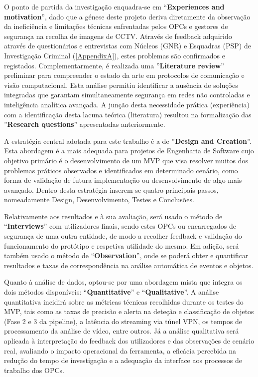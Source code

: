 O ponto de partida da investigação enquadra-se em ``\textbf{Experiences and motivation}'', dado que a génese deste projeto deriva diretamente da observação da ineficiência e limitações técnicas enfrentadas pelos \glspl{OPC} e gestores de segurança na recolha de imagens de \gls{CCTV}. Através de feedback adquirido através de questionários e entrevistas com Núcleos (\gls{GNR}) e Esquadras (\gls{PSP}) de Investigação Criminal (\autoref{AppendixA}), estes problemas são confirmados e registados. Complementarmente, é realizada uma ''\textbf{Literature review}'' preliminar para compreender o estado da arte em protocolos de comunicação e visão computacional. Esta análise permitiu identificar a ausência de soluções integradas que garantam simultaneamente segurança em redes não controladas e inteligência analítica avançada. A junção desta necessidade prática (experiência) com a identificação desta lacuna teórica (literatura) resultou na formalização das ''\textbf{Research questions}'' apresentadas anteriormente.

A estratégia central adotada para este trabalho é a de ''\textbf{Design and Creation}''. Esta abordagem é a mais adequada para projetos de Engenharia de Software cujo objetivo primário é o desenvolvimento de um \gls{MVP} que visa resolver muitos dos problemas práticos observados e identificados em determinado cenário, como forma de validação de futura implementação ou desenvolvimento de algo mais avançado. Dentro desta estratégia inserem-se quatro principais passos, nomeadamente Design, Desenvolvimento, Testes e Conclusões.

Relativamente aos resultados e à sua avaliação, será usado o método de ``\textbf{Interviews}'' com utilizadores finais, sendo estes \glspl{OPC} ou encarregados de segurança de uma outra entidade, de modo a recolher feedback e validação do funcionamento do protótipo e respetiva utilidade do mesmo. Em adição, será também usado o método de ``\textbf{Observation}'', onde se poderá obter e quantificar resultados e taxas de correspondência na análise automática de eventos e objetos.

Quanto à análise de dados, optou-se por uma abordagem mista que integra os dois métodos disponíveis: ``\textbf{Quantitative}'' e ``\textbf{Qualitative}''. A análise quantitativa incidirá sobre as métricas técnicas recolhidas durante os testes do \gls{MVP}, tais como as taxas de precisão e alerta na deteção e classificação de objetos (Fase 2 e 3 da pipeline), a latência do streaming via túnel \gls{VPN}, os tempos de processamento da análise de vídeo, entre outros. Já a análise qualitativa será aplicada à interpretação do feedback dos utilizadores e das observações de cenário real, avaliando o impacto operacional da ferramenta, a eficácia percebida na redução do tempo de investigação e a adequação da interface aos processos de trabalho dos \glspl{OPC}.


